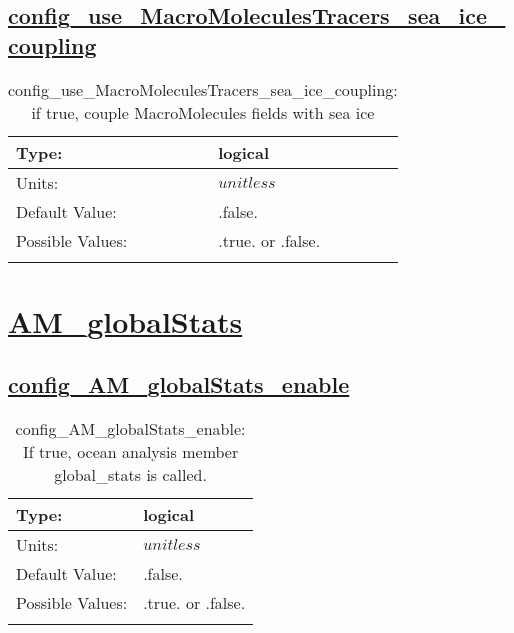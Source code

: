 \subsection[config\_use\_MacroMoleculesTracers\_sea\_ice\_coupling]{\hyperref[sec:nm_tab_tracer_forcing_MacroMoleculesTracers]{config\_use\_MacroMoleculesTracers\_sea\_ice\_coupling}}
\label{subsec:nm_sec_config_use_MacroMoleculesTracers_sea_ice_coupling}
\begin{center}
\begin{longtable}{| p{2.0in} || p{4.0in} |}
    \hline
    Type: & logical \\
    \hline
    Units: & $unitless$ \\
    \hline
    Default Value: & .false. \\
    \hline
    Possible Values: & .true. or .false. \\
    \hline
    \caption{config\_use\_MacroMoleculesTracers\_sea\_ice\_coupling: if true, couple MacroMolecules fields with sea ice}
\end{longtable}
\end{center}
\section[AM\_globalStats]{\hyperref[sec:nm_tab_AM_globalStats]{AM\_globalStats}}
\label{sec:nm_sec_AM_globalStats}
\subsection[config\_AM\_globalStats\_enable]{\hyperref[sec:nm_tab_AM_globalStats]{config\_AM\_globalStats\_enable}}
\label{subsec:nm_sec_config_AM_globalStats_enable}
\begin{center}
\begin{longtable}{| p{2.0in} || p{4.0in} |}
    \hline
    Type: & logical \\
    \hline
    Units: & $unitless$ \\
    \hline
    Default Value: & .false. \\
    \hline
    Possible Values: & .true. or .false. \\
    \hline
    \caption{config\_AM\_globalStats\_enable: If true, ocean analysis member global\_stats is called.}
\end{longtable}
\end{center}
